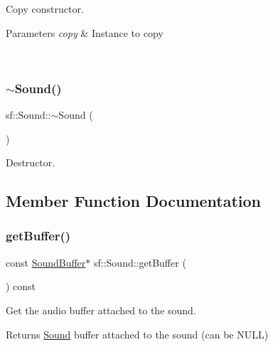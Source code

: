 Copy constructor. 


\begin{DoxyParams}{Parameters}
{\em copy} & Instance to copy \begin{DoxyVerb}\end{DoxyVerb}
 \\
\hline
\end{DoxyParams}
\mbox{\label{classsf_1_1_sound_ad0792c35310eba2dffd8489c80fad076}} 
\subsubsection{\texorpdfstring{$\sim$Sound()}{~Sound()}}
{\footnotesize\ttfamily sf\+::\+Sound\+::$\sim$\+Sound (\begin{DoxyParamCaption}{ }\end{DoxyParamCaption})}



Destructor. 

\begin{DoxyVerb}\end{DoxyVerb}
 

\subsection{Member Function Documentation}
\mbox{\label{classsf_1_1_sound_ab873727ae652c96b5a9437d7f8d8a44d}} 
\subsubsection{\texorpdfstring{getBuffer()}{getBuffer()}}
{\footnotesize\ttfamily const \mbox{\hyperlink{classsf_1_1_sound_buffer}{Sound\+Buffer}}$\ast$ sf\+::\+Sound\+::get\+Buffer (\begin{DoxyParamCaption}{ }\end{DoxyParamCaption}) const}



Get the audio buffer attached to the sound. 

\begin{DoxyReturn}{Returns}
\mbox{\hyperlink{classsf_1_1_sound}{Sound}} buffer attached to the sound (can be N\+U\+LL) \begin{DoxyVerb}\end{DoxyVerb}
 
\end{DoxyReturn}
\mbox{\label{classsf_1_1_sound_a054da07266ce8f39229495146e3041eb}} 
